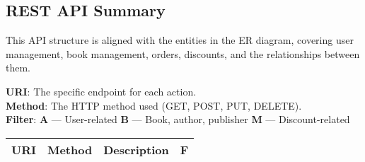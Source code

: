 \subsection{REST API Summary}

This API structure is aligned with the entities in the ER diagram, covering user management, book management, orders, discounts, and the relationships between them.

\textbf{URI}: The specific endpoint for each action. \\
\textbf{Method}: The HTTP method used (GET, POST, PUT, DELETE). \\
\textbf{Filter}: \textbf{A} — User-related \quad \textbf{B} — Book, author, publisher \quad \textbf{M} — Discount-related

\begin{longtable}{|p{}|p{} |p{}|p{}|}
    \hline
    \textbf{URI} & \textbf{Method} & \textbf{Description} & \textbf{F}
    \\\hline


\end{longtable}
